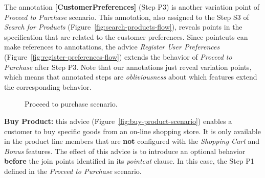 \documentclass{acm_proc_article-sp}
\begin{document}
{\color{red} The annotation \mbox{{\bf [CustomerPreferences]}} (Step P3) is another variation point of \emph{Proceed to Purchase} scenario. This annotation, also assigned to the Step S3 of \emph{Search for Products} (Figure~\ref{fig:search-products-flow}), reveals points in the specification that are related to the customer preferences. Since pointcuts can make references to annotations, the advice \emph{Register User Preferences} (Figure~\ref{fig:register-preferences-flow}) extends the behavior of \emph{Proceed to Purchase} after Step P3. Note that our annotations just reveal variation points, which means that  
annotated steps are \emph{obliviousness} about which features extend the corresponding behavior. }


\begin{figure}[h]
\caption{Proceed to purchase scenario.}
\label{fig:proceed-to-checkout}
\end{figure}

{\bf Buy Product:} this advice (Figure~\ref{fig:buy-product-scenario}) enables a
customer to buy specific goods from an on-line shopping store. It is only
available in the product line members that are {\bf not} configured with the
\emph{Shopping Cart} and \emph{Bonus} features. The effect of this advice is to
introduce an optional behavior {\bf before} the join points identified in its
\emph{pointcut} clause. In this case, the Step P1 defined in the \emph{Proceed to
Purchase} scenario.
\end{document}
